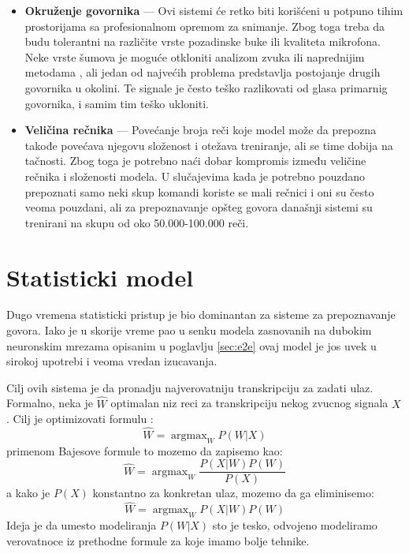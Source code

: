 \documentclass[a4paper]{article}
\DeclareMathOperator*{\argmax}{argmax}
\begin{document}
\begin{itemize}
  \item \textbf{Okruženje govornika} --- 
  Ovi sistemi će retko biti korišćeni u potpuno tihim prostorijama sa profesionalnom opremom za snimanje. Zbog toga treba da budu tolerantni na različite vrste pozadinske buke ili kvaliteta mikrofona. 
  Neke vrste šumova je moguće otkloniti analizom zvuka ili naprednijim metodama \cite{xu2015enhancement}, ali jedan od najvećih problema predstavlja postojanje drugih govornika u okolini.
  Te signale je često teško razlikovati od glasa primarnig govornika, i samim tim teško ukloniti.
  
  \item \textbf{Veličina rečnika} --- 
  Povećanje broja reči koje model može da prepozna takođe povećava njegovu složenost i otežava treniranje, ali se time dobija na tačnosti. 
  Zbog toga je potrebno naći dobar kompromis između veličine rečnika i složenosti modela. 
  U slučajevima kada je potrebno pouzdano prepoznati samo neki skup komandi koriste se mali rečnici i oni su često veoma pouzdani, ali za prepoznavanje opšteg govora današnji sistemi su trenirani na skupu od oko 50.000-100.000 reči.
\end{itemize}

\section{Statisticki model}
\label{sec:statistical}

Dugo vremena statisticki pristup je bio dominantan za sisteme za prepoznavanje govora.
Iako je u skorije vreme pao u senku modela zasnovanih na dubokim neuronskim mrezama opisanim u poglavlju \ref{sec:e2e} ovaj model je jos uvek u sirokoj upotrebi i veoma vredan izucavanja.

Cilj ovih sistema je da pronadju najverovatniju transkripciju za zadati ulaz.
Formalno, neka je $\hat{W}$ optimalan niz reci za transkripciju nekog zvucnog signala $X$. Cilj je optimizovati formulu \cite{kamath2019nlp}:
\begin{equation*}
  \hat{W} = \argmax_{W} P(W|X)
\end{equation*}
primenom Bajesove formule to mozemo da zapisemo kao:
\begin{equation*}
  \hat{W} = \argmax_{W} \frac{P(X|W) P(W)}{P(X)}
\end{equation*}
a kako je $P(X)$ konstantno za konkretan ulaz, mozemo da ga eliminisemo:
\begin{equation}
  \label{eq:stat1}
  \hat{W} = \argmax_{W} P(X|W) P(W)
\end{equation}
Ideja je da umesto modeliranja $P(W|X)$ sto je tesko, odvojeno modeliramo verovatnoce iz prethodne formule za koje imamo bolje tehnike.
\end{document}
